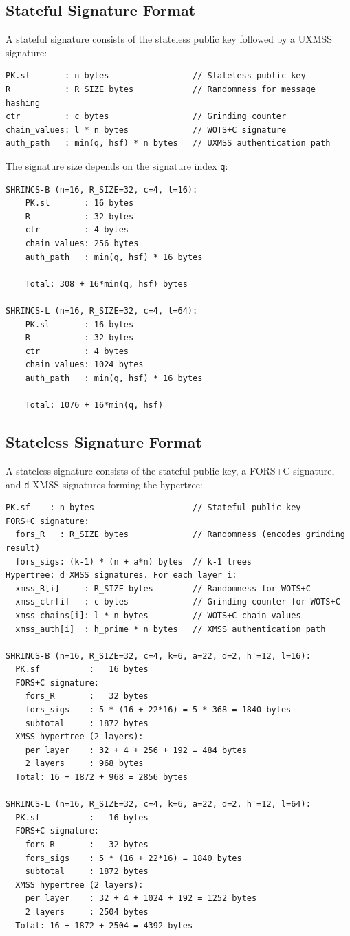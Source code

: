 \subsection{Stateful Signature Format}
A stateful signature consists of the stateless public key followed by a UXMSS signature:
\begin{verbatim}
PK.sl       : n bytes                 // Stateless public key
R           : R_SIZE bytes            // Randomness for message hashing  
ctr         : c bytes                 // Grinding counter
chain_values: l * n bytes             // WOTS+C signature
auth_path   : min(q, hsf) * n bytes   // UXMSS authentication path
\end{verbatim}
The signature size depends on the signature index \texttt{q}:
\begin{verbatim}
SHRINCS-B (n=16, R_SIZE=32, c=4, l=16):
    PK.sl       : 16 bytes
    R           : 32 bytes
    ctr         : 4 bytes
    chain_values: 256 bytes  
    auth_path   : min(q, hsf) * 16 bytes
  
    Total: 308 + 16*min(q, hsf) bytes

SHRINCS-L (n=16, R_SIZE=32, c=4, l=64):
    PK.sl       : 16 bytes
    R           : 32 bytes  
    ctr         : 4 bytes
    chain_values: 1024 bytes   
    auth_path   : min(q, hsf) * 16 bytes
  
    Total: 1076 + 16*min(q, hsf)
\end{verbatim}

\subsection{Stateless Signature Format}
A stateless signature consists of the stateful public key, a FORS+C signature, and \texttt{d} XMSS signatures forming the hypertree:
\begin{verbatim}
PK.sf    : n bytes                    // Stateful public key
FORS+C signature:
  fors_R   : R_SIZE bytes             // Randomness (encodes grinding result)
  fors_sigs: (k-1) * (n + a*n) bytes  // k-1 trees
Hypertree: d XMSS signatures. For each layer i:
  xmss_R[i]     : R_SIZE bytes        // Randomness for WOTS+C
  xmss_ctr[i]   : c bytes             // Grinding counter for WOTS+C
  xmss_chains[i]: l * n bytes         // WOTS+C chain values
  xmss_auth[i]  : h_prime * n bytes   // XMSS authentication path

SHRINCS-B (n=16, R_SIZE=32, c=4, k=6, a=22, d=2, h'=12, l=16):
  PK.sf          :   16 bytes
  FORS+C signature:
    fors_R       :   32 bytes
    fors_sigs    : 5 * (16 + 22*16) = 5 * 368 = 1840 bytes
    subtotal     : 1872 bytes
  XMSS hypertree (2 layers):
    per layer    : 32 + 4 + 256 + 192 = 484 bytes
    2 layers     : 968 bytes
  Total: 16 + 1872 + 968 = 2856 bytes

SHRINCS-L (n=16, R_SIZE=32, c=4, k=6, a=22, d=2, h'=12, l=64):
  PK.sf          :   16 bytes
  FORS+C signature:
    fors_R       :   32 bytes
    fors_sigs    : 5 * (16 + 22*16) = 1840 bytes
    subtotal     : 1872 bytes
  XMSS hypertree (2 layers):
    per layer    : 32 + 4 + 1024 + 192 = 1252 bytes
    2 layers     : 2504 bytes
  Total: 16 + 1872 + 2504 = 4392 bytes
\end{verbatim}

